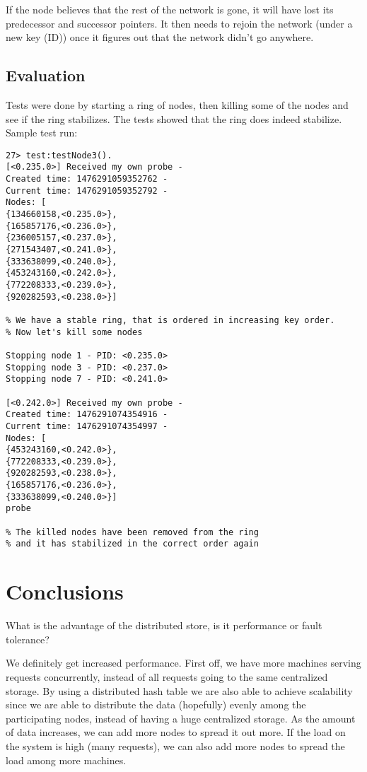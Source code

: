 \documentclass[a4paper, 11pt]{article}
\begin{document}
If the node believes that the rest of the network is gone, it will have lost its predecessor and successor pointers. It then needs to rejoin the network (under a new key (ID)) once it figures out that the network didn't go anywhere.

\subsection{Evaluation}

Tests were done by starting a ring of nodes, then killing some of the nodes and see if the ring stabilizes. The tests showed that the ring does indeed stabilize. Sample test run:

\begin{verbatim}
27> test:testNode3().
[<0.235.0>] Received my own probe - 
Created time: 1476291059352762 - 
Current time: 1476291059352792 - 
Nodes: [
{134660158,<0.235.0>},
{165857176,<0.236.0>},
{236005157,<0.237.0>},
{271543407,<0.241.0>},
{333638099,<0.240.0>},
{453243160,<0.242.0>},
{772208333,<0.239.0>},
{920282593,<0.238.0>}]

% We have a stable ring, that is ordered in increasing key order.
% Now let's kill some nodes

Stopping node 1 - PID: <0.235.0>
Stopping node 3 - PID: <0.237.0>
Stopping node 7 - PID: <0.241.0>

[<0.242.0>] Received my own probe - 
Created time: 1476291074354916 - 
Current time: 1476291074354997 - 
Nodes: [
{453243160,<0.242.0>},
{772208333,<0.239.0>},
{920282593,<0.238.0>},
{165857176,<0.236.0>},
{333638099,<0.240.0>}]
probe

% The killed nodes have been removed from the ring
% and it has stabilized in the correct order again
\end{verbatim}

\section{Conclusions}

What is the advantage of the distributed store, is it performance or fault tolerance? 

We definitely get increased performance. First off, we have more machines serving requests concurrently, instead of all requests going to the same centralized storage. By using a distributed hash table we are also able to achieve scalability since we are able to distribute the data (hopefully) evenly among the participating nodes, instead of having a huge centralized storage. As the amount of data increases, we can add more nodes to spread it out more. If the load on the system is high (many requests), we can also add more nodes to spread the load among more machines.
\end{document}
